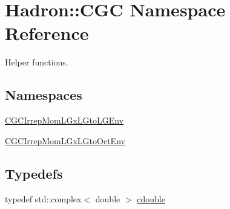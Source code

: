\hypertarget{namespaceHadron_1_1CGC}{}\section{Hadron\+:\+:C\+GC Namespace Reference}
\label{namespaceHadron_1_1CGC}


Helper functions.  


\subsection*{Namespaces}
\begin{DoxyCompactItemize}
\item 
 \mbox{\hyperlink{namespaceHadron_1_1CGC_1_1CGCIrrepMomLGxLGtoLGEnv}{C\+G\+C\+Irrep\+Mom\+L\+Gx\+L\+Gto\+L\+G\+Env}}
\item 
 \mbox{\hyperlink{namespaceHadron_1_1CGC_1_1CGCIrrepMomLGxLGtoOctEnv}{C\+G\+C\+Irrep\+Mom\+L\+Gx\+L\+Gto\+Oct\+Env}}
\end{DoxyCompactItemize}
\subsection*{Typedefs}
\begin{DoxyCompactItemize}
\item 
typedef std\+::complex$<$ double $>$ \mbox{\hyperlink{namespaceHadron_1_1CGC_a52d2b70e6792726fb525eab94daae53b}{cdouble}}
\end{DoxyCompactItemize}
